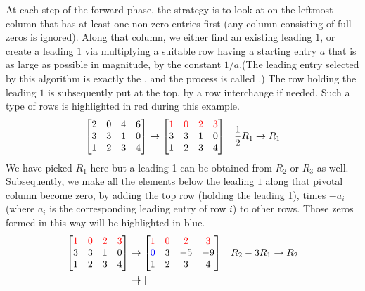 \begin{solution}
At each step of the forward phase, the strategy is to look at on the leftmost column that has at least one non-zero entries first (any column consisting of full zeros is ignored). Along that column, we either find an existing leading $1$, or create a leading $1$ via multiplying a suitable row having a starting entry $a$ that is as large as possible in magnitude, by the constant $1/a$.(The leading entry selected by this algorithm is exactly the , and the process is called .) The row holding the leading $1$ is subsequently put at the top, by a row interchange if needed. Such a type of rows is highlighted in red during this example.
\begin{align*}
\begin{bmatrix}
2 & 0 & 4 & 6 \\
3 & 3 & 1 & 0 \\
1 & 2 & 3 & 4
\end{bmatrix}
&\to
\begin{bmatrix}
\textcolor{red}{1} & \textcolor{red}{0} & \textcolor{red}{2} & \textcolor{red}{3} \\
3 & 3 & 1 & 0 \\
1 & 2 & 3 & 4
\end{bmatrix}
& \frac{1}{2}R_1 \to R_1
\end{align*}
We have picked $R_1$ here but a leading 1 can be obtained from $R_2$ or $R_3$ as well. Subsequently, we make all the elements below the leading $1$ along that pivotal column become zero, by adding the top row (holding the leading 1), times $-a_i$ (where $a_i$ is the corresponding leading entry of row $i$) to other rows. Those zeros formed in this way will be highlighted in blue.
\begin{align*}
\begin{bmatrix}
\textcolor{red}{1} & \textcolor{red}{0} & \textcolor{red}{2} & \textcolor{red}{3} \\
3 & 3 & 1 & 0 \\
1 & 2 & 3 & 4
\end{bmatrix}
&\to
\begin{bmatrix}
\textcolor{red}{1} & \textcolor{red}{0} & \textcolor{red}{2} & \textcolor{red}{3} \\
\textcolor{blue}{0} & 3 & -5 & -9 \\
1 & 2 & 3 & 4
\end{bmatrix}
& R_2-3R_1 \to R_2 \\
&\to
\begin{bmatrix}

\end{bmatrix}
\end{align*}
\end{solution}
